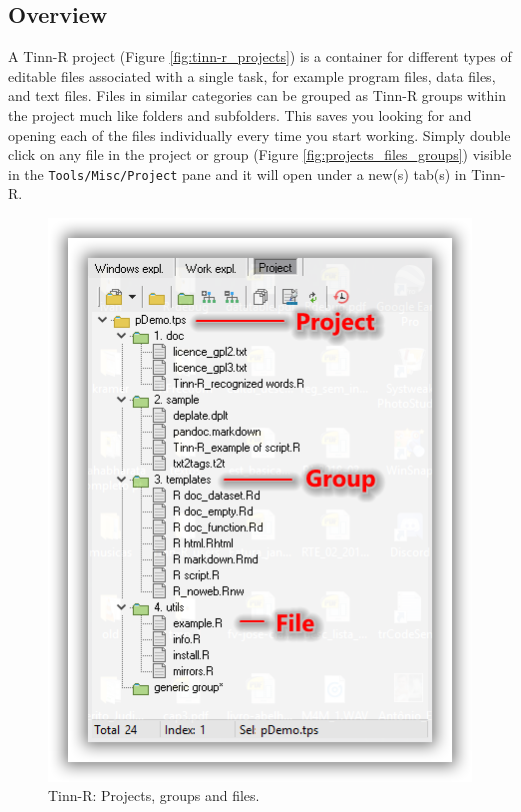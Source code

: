 \subsection{Overview}
A Tinn-R project (Figure \ref{fig:tinn-r_projects}) is a container for different types of editable 
files associated with a single task, for example program files, data files, and text files. 
Files in similar categories can be grouped as Tinn-R groups within the project much like folders and subfolders.  
This saves you looking for and opening each of the files individually every time you start working. 
Simply double click on any file in the project or group
(Figure \ref{fig:projects_files_groups})
visible in the \texttt{Tools/Misc/Project} pane
and it will open under a new(s) tab(s) in Tinn-R.

\begin{figure}[H]
  \begin{center}
    \includegraphics[scale=0.60]{./res/projects_files_groups.png}
  \end{center}
  \caption{Tinn-R: Projects, groups and files.}
  \label{fig:tinn-r_projects_file_groups}
\end{figure}

